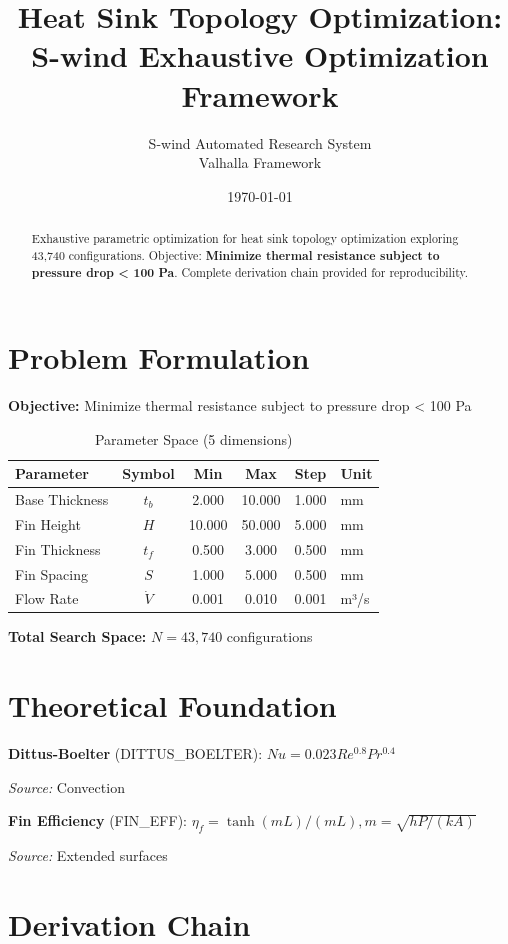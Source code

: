 \documentclass[11pt,twocolumn]{article}
\title{Heat Sink Topology Optimization: \\S-wind Exhaustive Optimization Framework}
\author{S-wind Automated Research System\\Valhalla Framework}
\date{\today}
\begin{document}
\maketitle

\begin{abstract}
Exhaustive parametric optimization for heat sink topology optimization exploring 43,740 configurations.
Objective: \textbf{Minimize thermal resistance subject to pressure drop < 100 Pa}.
Complete derivation chain provided for reproducibility.
\end{abstract}

\section{Problem Formulation}
\textbf{Objective:} Minimize thermal resistance subject to pressure drop < 100 Pa

\begin{table}[h]
\centering
\caption{Parameter Space (5 dimensions)}
\begin{tabular}{@{}lccccl@{}}
\toprule
Parameter & Symbol & Min & Max & Step & Unit \\
\midrule
Base Thickness & $t_b$ & 2.000 & 10.000 & 1.000 & mm \\
Fin Height & $H$ & 10.000 & 50.000 & 5.000 & mm \\
Fin Thickness & $t_f$ & 0.500 & 3.000 & 0.500 & mm \\
Fin Spacing & $S$ & 1.000 & 5.000 & 0.500 & mm \\
Flow Rate & $\dot{V}$ & 0.001 & 0.010 & 0.001 & m³/s \\
\bottomrule
\end{tabular}
\end{table}

\textbf{Total Search Space:} $N = 43,740$ configurations

\section{Theoretical Foundation}
\textbf{Dittus-Boelter} (DITTUS_BOELTER): $Nu = 0.023 Re^{0.8} Pr^{0.4}$

\textit{Source:} Convection

\textbf{Fin Efficiency} (FIN_EFF): $\eta_f = \tanh(mL)/(mL), m=\sqrt{hP/(kA)}$

\textit{Source:} Extended surfaces


\section{Derivation Chain}
\end{document}
